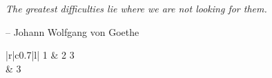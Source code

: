\documentclass[12pt, a4paper, oneside]{report}	%
\begin{document}
\begin{enumerate}[label=\arabic*)]

\begin{enumerate}[label=\alph*)]



\usepackage[auto]{chappg}




\usepackage{epigraph}
\epigraph{\textit{The greatest difficulties lie where we are not looking for them.}}
{-- Johann Wolfgang von Goethe}




\renewcommand\contentsname{Оглавление} %

\renewcommand{\thechapter}{\arabic{chapter}.} %
\renewcommand{\thesubsection}{\arabic{section}.\arabic{subsection}.}



\begin{table}[h]\caption{Name of table}\label{name}
	\begin{tabular}{|r|c{0.7\linewidth}|l|} %
		1 & 2 3 \\

		 & 3 \\
		\multirow{}{}
	\end{tabular}
\end{table}


\hline




\end{enumerate}
\end{enumerate}
\end{document}

